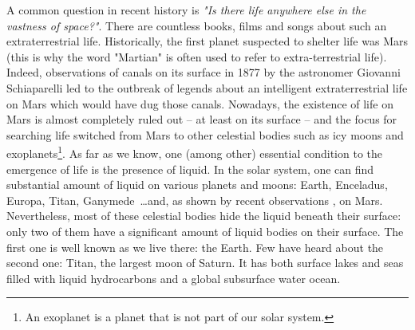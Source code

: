 A common question in recent history is \textit{"Is there life anywhere else in the vastness of space?"}. There are countless books, films and songs about such an extraterrestrial life. Historically, the first planet suspected to shelter life was Mars (this is why the word "Martian" is often used to refer to extra-terrestrial life). Indeed, observations of canals on its surface in 1877 by the astronomer Giovanni Schiaparelli led to the outbreak of legends about an intelligent extraterrestrial life on Mars which would have dug those canals. Nowadays, the existence of life on Mars is almost completely ruled out -- at least on its surface -- and the focus for searching life switched from Mars to other celestial bodies such as icy moons and exoplanets\footnote{An exoplanet is a planet that is not part of our solar system.}. As far as we know, one (among other) essential condition to the emergence of life is the presence of liquid. In the solar system, one can find substantial amount of liquid on various planets and moons: Earth, Enceladus, Europa, Titan, Ganymede~\dots and, as shown by recent observations \citep{orosei2018radar}, on Mars. Nevertheless, most of these celestial bodies hide the liquid beneath their surface: only two of them have a significant amount of liquid bodies on their surface. The first one is well known as we live there: the Earth. Few have heard about the second one: Titan, the largest moon of Saturn. It has both surface lakes and seas filled with liquid hydrocarbons and a global subsurface water ocean. 
 
